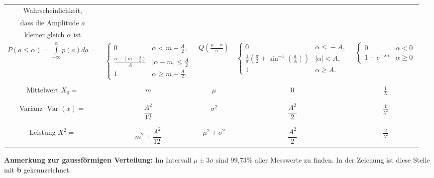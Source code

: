 \begin{table}
\begin{center}
\begin{tabular}{|c|c|c|c|c|}
 Wahrscheinlichkeit,& & & &\\ 
dass die Amplitude $a$ & & & &\\  
kleiner gleich $\alpha$ ist& & & & \\ 
$P(a\!\leq\!\alpha)\!=\!\!\int\limits_{-\infty}^{\alpha}\!p(a)da=$ &
$\begin{cases}0&\alpha<m-\frac{A}{2},\\ \frac{\alpha-(m-\frac{A}{2})}{A}&
|\alpha-m|\leq\frac{A}{2} \\1&\alpha\geq m+\frac{A}{2}. \end{cases}$  &
$Q\left(\frac{\displaystyle\mu-\alpha}{\displaystyle\sigma}\right)$ &
$\begin{cases}0&\alpha\!\leq\!-A,\\
\frac{1}{\pi}\left(\frac{\pi}{2}\!+\!\sin^{-1}\!\left(\frac{a}{A}\right)\right)&
|\alpha|\!<\!A,\\1&\alpha\geq A. \end{cases}$ &
$\begin{cases}
	0 & \alpha < 0\\
	1-e^{-\lambda \alpha} & \alpha \geq 0
\end{cases}$\\ \hline      
 & & & & \\ 
Mittelwert $X_0 =$& $m$ & $\mu$ & 0 & $\frac{1}{\lambda}$\\ 
& & & &\\ \hline
& & & &\\
Varianz $\operatorname{Var}(x) = $& $\dfrac{A^2}{12}$
& $\sigma^2$ & $\dfrac{A^2}{2}$ & $\frac{1}{\lambda^2}$\\ & & & & \\ \hline
& & & &\\
Leistung $X^2 =$& $m^2+\dfrac{A^2}{12}$ &
$\mu^2+\sigma^2$ & $\dfrac{A^2}{2}$ & $\frac{2}{\lambda^2}$ \\ 
& & & & \\ \hline
\end{tabular}

\textbf{Anmerkung zur gaussförmigen Verteilung:} Im Intervall $\mu \pm 3\sigma$
sind 99,73\% aller Messwerte zu finden. In der Zeichung ist diese Stelle mit
\textbf{b} gekennzeichnet.
\end{center}
\end{table}




